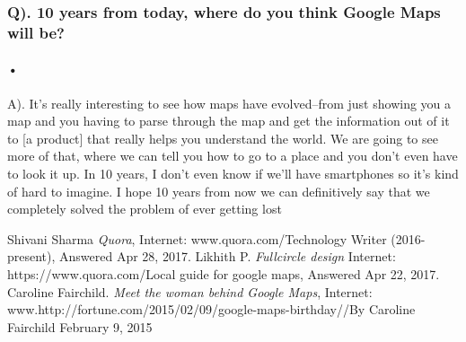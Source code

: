 \documentclass[7pt]{article}
\begin{document}
\subsubsection*{Q). 10 years from today, where do you think Google Maps will be?}
\paragraph{•} 
A). It’s really interesting to see how maps have evolved–from just showing you a map and you having to parse through the map and get the information out of it to [a product] that really helps you understand the world. We are going to see more of that, where we can tell you how to go to a place and you don’t even have to look it up. In 10 years, I don’t even know if we’ll have smartphones so it’s kind of hard to imagine. I hope 10 years from now we can definitively say that we completely solved the problem of ever getting lost\cite{Caroline}

\begin{thebibliography}{9}
 Shivani Sharma \textit{Quora}, 
Internet: www.quora.com/Technology Writer (2016-present), Answered Apr 28, 2017.
 Likhith P. \textit{Fullcircle design} 
Internet: https://www.quora.com/Local guide for google maps, Answered Apr 22, 2017.
 Caroline Fairchild. \textit{Meet the woman behind Google Maps},
 Internet: www.http://fortune.com/2015/02/09/google-maps-birthday//By Caroline Fairchild 
February 9, 2015 

\end{thebibliography}
\end{document}
